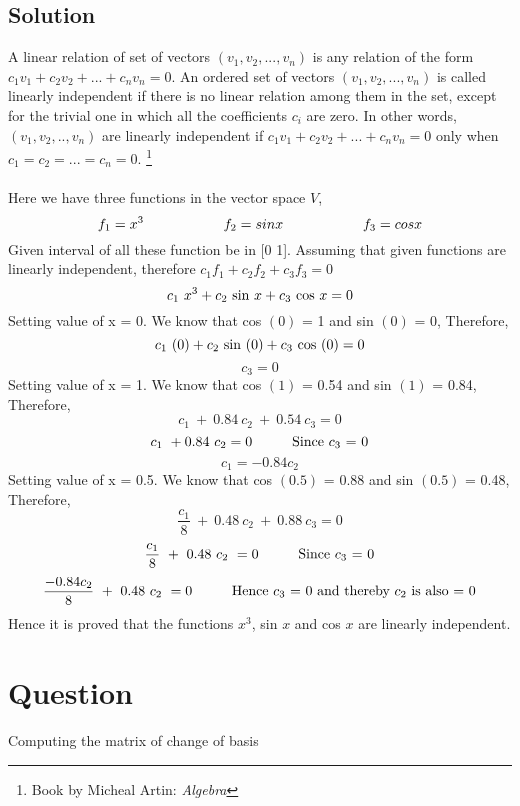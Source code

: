 \documentclass[12pt]{article}
\newcommand\tab[1][1cm]{\hspace*{#1}}
\begin{document}
\subsection{Solution}
\noindent
\tab A linear relation of set of vectors $(v_1,v_2,...,v_n)$ is any relation of the form $c_1v_1 + c_2v_2 + ... + c_nv_n = 0$.  An ordered set of vectors $(v_1,v_2,...,v_n)$ is called linearly independent if there is no linear relation  among them in the set, except for the trivial one in which all the coefficients $c_i$ are zero. In other words, $(v_1,v_2,..,v_n)$ are linearly independent if $c_1v_1 + c_2v_2 + ... + c_nv_n = 0$ only when $c_1 = c_2 = ... = c_n = 0$.  \footnote{Book by Micheal Artin: \textit{Algebra}}\\ \\
\noindent
\tab Here we have three functions in the vector space $V$, 
$$
f_1 = x^3 \tab \tab f_2 = sin x \tab \tab f_3 = cos x
$$
\noindent
\tab Given interval of all these function be in [0 1]. Assuming that given functions are linearly independent, therefore $c_1f_1 + c_2f_2 +c_3f_3 = 0$
\noindent
	$$
	c_1\ x^3 + c_2\ \textnormal{sin}\ x +c_3\  \textnormal{cos}\ x = 0
    $$
    \textnormal{\tab Setting value of x = 0. We know that cos $(0)$ = 1 and sin $(0)$ = 0, Therefore,}
    $$c_1\ (0)+ c_2\ \textnormal{sin}\ (0) + c_3\  \textnormal{cos}\ (0) = 0$$
    $$c_3 = 0$$
    \textnormal{\tab Setting value of x = 1. We know that cos $(1)$ = 0.54 and sin $(1)$ = 0.84, Therefore,} 
    $$c_1\ +\ 0.84\ c_2\ +\ 0.54\ c_3 = 0
    $$
    $$c_1\ +0.84\ c_2 = 0 \tab \textnormal{Since $c_3$ = 0}$$
    $$c_1 = -0.84c_2$$
    \textnormal{\tab Setting value of x = 0.5. We know that cos $(0.5)$ = 0.88 and sin $(0.5)$ = 0.48, Therefore,} 
    $$\frac{c_1}{8}\ +\ 0.48\ c_2\ +\ 0.88\ c_3 = 0
    $$
    $$\frac{c_1}{8}\ +\ 0.48\ c_2\ = 0  \tab \textnormal{Since $c_3$ = 0}
    $$
    $$\frac{-0.84c_2}{8}\ +\ 0.48\ c_2\ = 0  \tab \textnormal{Hence $c_3$ = 0 and thereby $c_2$ is also = 0}
    $$
\noindent
\tab Hence it is proved that the functions $x^3$, sin $x$ and cos $x$ are linearly independent.
\clearpage
\section{Question}
Computing the matrix of change of basis
\end{document}
